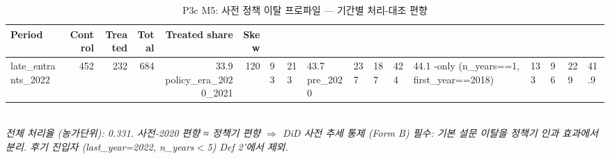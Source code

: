 \begin{table}[t]
\centering
\caption{P3c M5: 사전 정책 이탈 프로파일 — 기간별 처리-대조 편향}
\label{tab:ch5_attrition_profile_ko}
\begin{tabular}{lrrrrr}
\toprule
Period & Control & Treated & Total & Treated share & Skew \\
\midrule
late_entrants_2022 & 452 & 232 & 684 & 33.9%
policy_era_2020_2021 & 120 & 93 & 213 & 43.7%
pre_2020 & 237 & 187 & 424 & 44.1%
-only (n\_years==1, first\_year==2018) & 133 & 96 & 229 & 41.9%
\bottomrule
\end{tabular}\\
\footnotesize\textit{전체 처리율 (농가단위): 0.331. 사전-2020 편향 ≈ 정책기 편향 $\Rightarrow$ DiD 사전 추세 통제 (Form B) 필수: 기본 설문 이탈을 정책기 인과 효과에서 분리. 후기 진입자 (last\_year=2022, n\_years$<$5) Def 2'에서 제외.}
\end{table}

